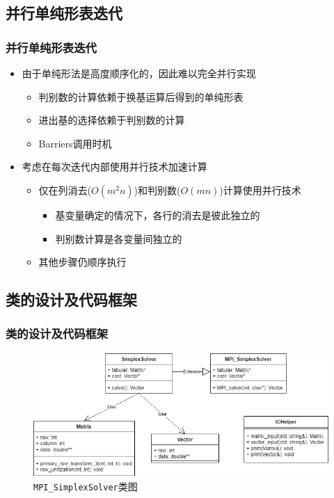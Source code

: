 \documentclass{beamer}
\begin{document}
\subsection{并行单纯形表迭代}
\begin{frame}
    \frametitle{并行单纯形表迭代}
    \begin{itemize}
        \item 由于单纯形法是高度顺序化的，因此难以完全并行实现
              \begin{itemize}
                  \item 判别数的计算依赖于换基运算后得到的单纯形表
                  \item 进出基的选择依赖于判别数的计算
                  \item Barriers调用时机
              \end{itemize}
        \item 考虑在每次迭代内部使用并行技术加速计算
              \begin{itemize}
                  \item 仅在列消去($O(m^2n)$)和判别数($O(mn)$)计算使用并行技术
                        \begin{itemize}
                            \item 基变量确定的情况下，各行的消去是彼此独立的
                            \item 判别数计算是各变量间独立的
                        \end{itemize}
                  \item 其他步骤仍顺序执行
              \end{itemize}
    \end{itemize}
\end{frame}

\subsection{类的设计及代码框架}
\begin{frame}
    \frametitle{类的设计及代码框架}
    \begin{figure}[H]
        \centering
        \includegraphics[width=1\linewidth]{MPI_SimplexSolver.drawio.png}
        \caption{\texttt{MPI\_SimplexSolver}类图}
    \end{figure}
\end{frame}
\end{document}
